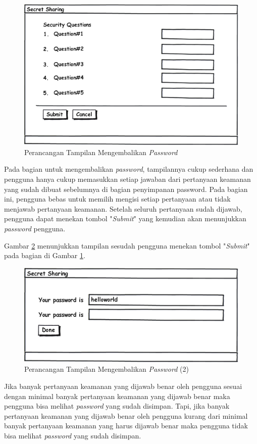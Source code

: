 \begin{figure}[H]
	\centerline{\includegraphics[scale=0.5]{Gambar/retrieve_password}}
	\caption{Perancangan Tampilan Mengembalikan \textit{Password}}\label{fig:retrieve_password}
\end{figure}

Pada bagian untuk mengembalikan \textit{password}, tampilannya cukup sederhana dan pengguna hanya cukup memasukkan setiap jawaban dari pertanyaan keamanan yang sudah dibuat sebelumnya di bagian penyimpanan password. Pada bagian ini, pengguna bebas untuk memilih mengisi setiap pertanyaan atau tidak menjawab pertanyaan keamanan. Setelah seluruh pertanyaan sudah dijawab, pengguna dapat menekan tombol "\textit{Submit}" yang kemudian akan menunjukkan \textit{password} pengguna.

Gambar \ref{fig:password} menunjukkan tampilan sesudah pengguna menekan tombol "\textit{Submit}" pada bagian di Gambar \ref{fig:retrieve_password}.

\begin{figure}[H]
	\centerline{\includegraphics[scale=0.5]{Gambar/password}}
	\caption{Perancangan Tampilan Mengembalikan \textit{Password} (2)}\label{fig:password}
\end{figure}

Jika banyak pertanyaan keamanan yang dijawab benar oleh pengguna sesuai dengan minimal banyak pertanyaan keamanan yang dijawab benar maka pengguna bisa melihat \textit{password} yang sudah disimpan. Tapi, jika banyak pertanyaan keamanan yang dijawab benar oleh pengguna kurang dari minimal banyak pertanyaan keamanan yang harus dijawab benar maka pengguna tidak bisa melihat \textit{password} yang sudah disimpan.